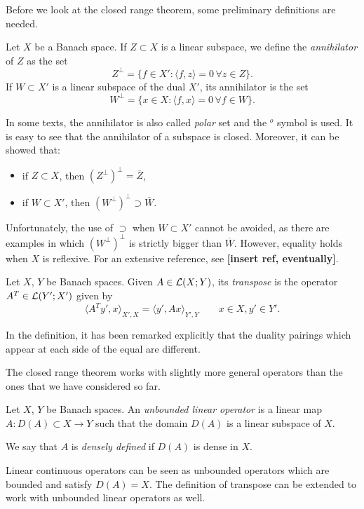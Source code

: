 Before we look at the closed range theorem, some preliminary definitions are needed.
\begin{definition}
	Let $X$ be a Banach space. If $Z \subset X$ is a linear subspace, we define the \emph{annihilator} of $Z$ as the set
	\[
	Z^\perp = \{f \in X' : \langle f, z \rangle = 0 \, \forall z \in Z\}.
	\]
	If $W \subset X'$ is a linear subspace of the dual $X'$, its annihilator is the set
	\[
	W^\perp = \{x \in X : \langle f, x \rangle = 0 \, \forall f \in W\}.
	\]
\end{definition}
In some texts, the annihilator is also called \emph{polar} set and the $^o$ symbol is used. It is easy to see that the annihilator of a subspace is closed. Moreover, it can be showed that:
\begin{itemize}
	\item if $Z \subset X$, then $(Z^\perp)^\perp = \overline{Z}$,
	\item if $W \subset X'$, then $(W^\perp)^\perp \supset \overline{W}$.
\end{itemize}
Unfortunately, the use of $\supset$ when $W \subset X'$ cannot be avoided, as there are examples in which $(W^\perp)^\perp$ is strictly bigger than $\overline{W}$. However, equality holds when $X$ is reflexive. For an extensive reference, see \textbf{[insert ref, eventually]}.

\begin{definition}
	Let $X$, $Y$ be Banach spaces. Given $A \in \mathcal{L}(X;Y)$, its \emph{transpose} is the operator $A^T \in \mathcal{L}(Y';X')$ given by
	\[
	\langle A^T y', x \rangle_{X',X} = \langle y', Ax \rangle_{Y',Y} \qquad x \in X, y' \in Y'.
	\]
\end{definition}
In the definition, it has been remarked explicitly that the duality pairings which appear at each side of the equal are different.

The closed range theorem works with slightly more general operators than the ones that we have considered so far.
\begin{definition}
	Let $X$, $Y$ be Banach spaces. An \emph{unbounded linear operator} is a linear map $A: D(A) \subset X \to Y$ such that the domain $D(A)$ is a linear subspace of $X$.
	
	We say that $A$ is \emph{densely defined} if $D(A)$ is dense in $X$.
\end{definition}
Linear continuous operators can be seen as unbounded operators which are bounded and satisfy $D(A) = X$.
The definition of transpose can be extended to work with unbounded linear operators as well.

